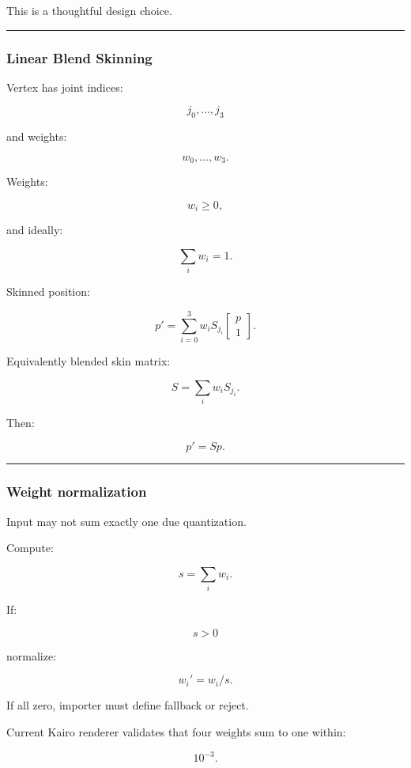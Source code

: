 This is a thoughtful design choice.

\begin{center}\rule{0.5\linewidth}{0.5pt}\end{center}

\subsubsection{Linear Blend Skinning}\label{linear-blend-skinning}

Vertex has joint indices:

\[
j_0,\dots,j_3
\]

and weights:

\[
w_0,\dots,w_3.
\]

Weights:

\[
w_i\ge0,
\]

and ideally:

\[
\boxed{
\sum_iw_i=1.
}
\]

Skinned position:

\[
\boxed{
p'
=
\sum_{i=0}^{3}
w_i
S_{j_i}
\begin{bmatrix}
p\\1
\end{bmatrix}.
}
\]

Equivalently blended skin matrix:

\[
S=
\sum_iw_iS_{j_i}.
\]

Then:

\[
p'=Sp.
\]

\begin{center}\rule{0.5\linewidth}{0.5pt}\end{center}

\subsubsection{Weight normalization}\label{weight-normalization}

Input may not sum exactly one due quantization.

Compute:

\[
s=
\sum_iw_i.
\]

If:

\[
s>0
\]

normalize:

\[
w_i'=w_i/s.
\]

If all zero, importer must define fallback or reject.

Current Kairo renderer validates that four weights sum to one within:

\[
10^{-3}.
\]

